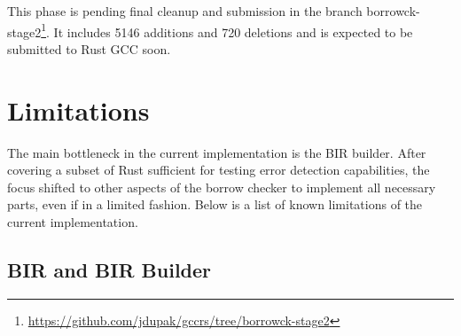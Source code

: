 \documentclass[
  11pt,
  twoside]{report}
\DeclareRobustCommand{\href}[2]{#2\footnote{\url{#1}}}
\begin{document}
This phase is pending final cleanup and submission in the branch
\href{https://github.com/jdupak/gccrs/tree/borrowck-stage2}{borrowck-stage2}.
It includes 5146 additions and 720 deletions and is expected to be
submitted to Rust GCC soon.

\section{Limitations}\label{sec:limitations}

The main bottleneck in the current implementation is the BIR builder.
After covering a subset of Rust sufficient for testing error detection
capabilities, the focus shifted to other aspects of the borrow checker
to implement all necessary parts, even if in a limited fashion. Below is
a list of known limitations of the current implementation.

\subsection{BIR and BIR Builder}\label{sec:bir-and-bir-builder}
\end{document}
